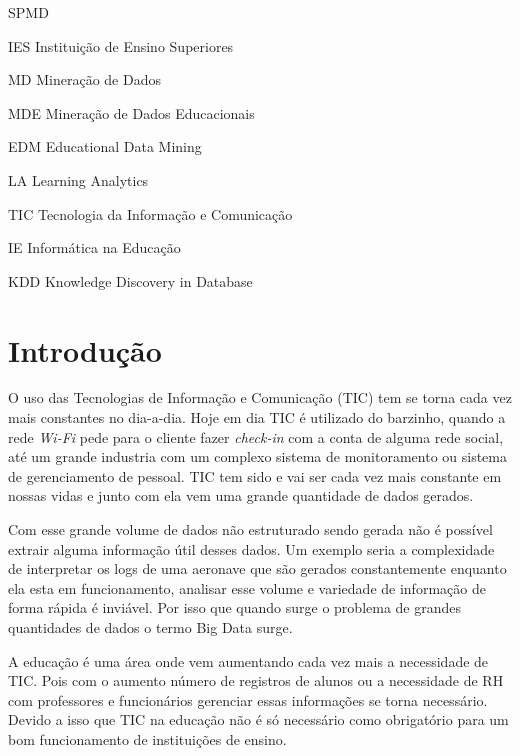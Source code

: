 \documentclass[ti]{texufpel} %
\begin{document}
\begin{listofabbrv}{SPMD}
        \item[IES] Instituição de Ensino Superiores
        \item[MD] Mineração de Dados
        \item[MDE] Mineração de Dados Educacionais
        \item[EDM] Educational Data Mining
        \item[LA] Learning Analytics
        \item[TIC] Tecnologia da Informação e Comunicação
        \item[IE] Informática na Educação
        \item[KDD] Knowledge Discovery in Database
\end{listofabbrv}

\tableofcontents

\chapter{Introdução}

O uso das Tecnologias de Informação e Comunicação (TIC) tem se torna cada vez mais constantes no dia-a-dia.
Hoje em dia TIC é utilizado do barzinho, quando a rede \textit{Wi-Fi} pede para o cliente fazer \textit{check-in} com a conta de alguma rede social,
até um grande industria com um complexo sistema de monitoramento ou sistema de gerenciamento de pessoal.
TIC tem sido e vai ser cada vez mais constante em nossas vidas e junto com ela vem uma grande quantidade de dados gerados.

Com esse grande volume de dados não estruturado sendo gerada não é possível extrair alguma informação útil desses dados.
Um exemplo seria a complexidade de interpretar os logs de uma aeronave que são gerados constantemente enquanto ela esta em funcionamento, analisar esse volume e variedade de informação de forma rápida é inviável.
Por isso que quando surge o problema de grandes quantidades de dados o termo Big Data surge.

A educação é uma área onde vem aumentando cada vez mais a necessidade de TIC.
Pois com o aumento número de registros de alunos ou a necessidade de RH com professores e funcionários gerenciar essas informações se torna necessário.
Devido a isso que TIC na educação não é só necessário como obrigatório para um bom funcionamento de instituições de ensino.
\end{document}
